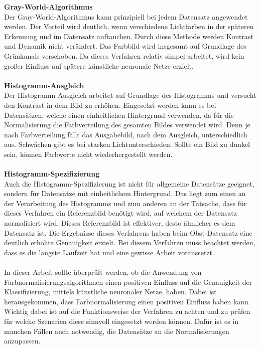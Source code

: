 \textbf{Gray-World-Algorithmus}\\
Der Gray-World-Algorithmus kann prinzipiell bei jedem Datensatz angewendet werden. Der Vorteil wird deutlich, wenn verschiedene Lichtfarben in der späteren Erkennung und im Datensatz auftauchen. Durch diese Methode werden Kontrast und Dynamik nicht verändert. Das Farbbild wird insgesamt auf Grundlage des Grünkanals verschoben. Da dieses Verfahren relativ simpel arbeitet, wird kein großer Einfluss auf spätere künstliche neuronale Netze erzielt.\\\\
\textbf{Histogramm-Ausgleich}\\
Der Histogramm-Ausgleich arbeitet auf Grundlage des Histogramms und versucht den Kontrast in dem Bild zu erhöhen. Eingesetzt werden kann es bei Datensätzen, welche einen einheitlichen Hintergrund verwenden, da für die Normalisierung die Farbverteilung des gesamten Bildes verwendet wird. Denn je nach Farbverteilung fällt das Ausgabebild, nach dem Ausgleich, unterschiedlich aus. Schwächen gibt es bei starken Lichtunterschieden. Sollte ein Bild zu dunkel sein, können Farbwerte nicht wiederhergestellt werden.\\\\
\textbf{Histogramm-Spezifizierung}\\
Auch die Histogramm-Spezifizierung ist nicht für allgemeine Datensätze geeignet, sondern für Datensätze mit einheitlichem Hintergrund. Das liegt zum einen an der Verarbeitung des Histogramms und zum anderen an der Tatsache, dass für dieses Verfahren ein Referenzbild benötigt wird, auf welchem der Datensatz normalisiert wird. Dieses Referenzbild ist effektiver, desto ähnlicher es dem Datensatz ist. Die Ergebnisse dieses Verfahrens haben beim Obst-Datensatz eine deutlich erhöhte Genauigkeit erzielt. Bei diesem Verfahren muss beachtet werden, dass es die längste Laufzeit hat und eine gewisse Arbeit voraussetzt.\\\\
In dieser Arbeit sollte überprüft werden, ob die Anwendung von Farbnormalisierungsalgorithmen einen positiven Einfluss auf die Genauigkeit der Klassifizierung, mittels künstliche neuronaler Netze, haben. Dabei ist herausgekommen, dass Farbnormalisierung einen positiven Einfluss haben kann. Wichtig dabei ist auf die Funktionsweise der Verfahren zu achten und zu prüfen für welche Szenarien diese sinnvoll eingesetzt werden können. Dafür ist es in manchen Fällen auch notwendig, die Datensätze an die Normalisierungen anzupassen.\\\\
